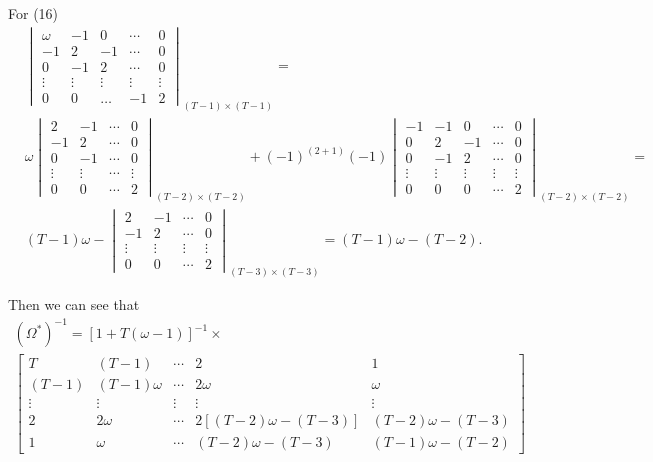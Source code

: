 \documentclass[12pt,a4paper,hyperref]{article}
\begin{document}
For (16)
\begin{align*}
& \begin{vmatrix}
 \omega & -1     & 0       &     \cdots    &0 \\
   -1   & 2      & -1      &     \cdots    &0 \\
    0   & -1     & 2       &    \cdots     & 0 \\
 \vdots & \vdots & \vdots  & \vdots  & \vdots\\
    0   &  0     &  \ldots & -1      & 2
\end{vmatrix}
_{(T-1)\times (T-1)}
= \\
& \omega
\begin{vmatrix}
 2     & -1     & \cdots & 0 \\
 -1    & 2      & \cdots &   0 \\
  0    & -1     & \cdots & 0 \\
\vdots & \vdots & \cdots & \vdots \\
   0   & 0      & \cdots & 2
\end{vmatrix}
_{(T-2) \times (T-2)}+(-1)^{(2+1)}(-1)
\begin{vmatrix}
 -1    &   -1   & 0 & \cdots & 0 \\
 0     &   2    & -1 & \cdots & 0\\
 0     &   -1   & 2& \cdots & 0\\
\vdots & \vdots & \vdots & \vdots &\vdots  \\
 0     & 0      & 0 & \cdots & 2
\end{vmatrix}
_{(T-2) \times (T-2)}
= \\
& (T-1)\omega-
\begin{vmatrix}
  2    & -1 & \cdots & 0\\
  -1   & 2& \cdots & 0\\
\vdots & \vdots & \vdots &\vdots  \\
 0      & 0 & \cdots & 2
\end{vmatrix}
_{(T-3) \times (T-3)}
=(T-1) \omega-(T-2).
\end{align*}


Then we can see that
\begin{align*}
(\Omega^{*})^{-1}=[1+T(\omega-1)]^{-1} \times \\
\begin{bmatrix}
   T    &   (T-1)   &   \cdots  & 2    &  1  \\
   (T-1)    & (T-1)\omega     &  \cdots   &  2 \omega   &  \omega    \\
   \vdots &  \vdots &  \vdots   & \vdots & \vdots \\
   2    & 2 \omega     &  \cdots  & 2[(T-2)\omega -(T-3)]   & (T-2)\omega -(T-3)   \\
  1    & \omega     &  \cdots  & (T-2)\omega -(T-3)   & (T-1)\omega -(T-2)
\end{bmatrix}
\end{align*}
\newpage
\end{document}
